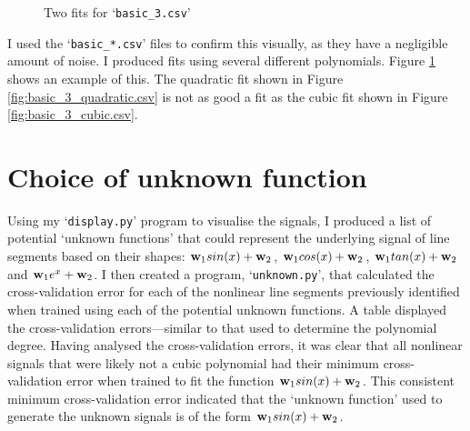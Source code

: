 \documentclass[onecolumn, 12pt, a4paper]{article}
\begin{document}
\begin{figure}[htbp]
    \centering
    \hfill
    \caption{Two fits for `\texttt{basic\_3.csv}'}
    \label{fig:basic_3.csv}
\end{figure}

I used the `\texttt{basic\_*.csv}' files to confirm this visually,
as they have a negligible amount of noise.
I produced fits using several different polynomials.
Figure \ref{fig:basic_3.csv} shows an example of this.
The quadratic fit shown in Figure \ref{fig:basic_3_quadratic.csv}
is not as good a fit as the cubic fit shown in Figure \ref{fig:basic_3_cubic.csv}.

\section{Choice of unknown function}

Using my `\texttt{display.py}' program to visualise the
signals, I produced a list of potential `unknown functions'
that could represent the underlying signal of line segments
based on their shapes:
$\vb{w}_{1}sin(x) + \vb{w}_{2}$,
$\vb{w}_{1}cos(x) + \vb{w}_{2}$,
$\vb{w}_{1}tan(x) + \vb{w}_{2}$ and
$\vb{w}_{1}e^{x} + \vb{w}_{2}$.
I then created a program, `\texttt{unknown.py}', that
calculated the cross-validation error for each of the
nonlinear line segments previously identified when
trained using each of the potential unknown functions.
A table displayed the cross-validation errors---similar 
to that used to determine the polynomial degree.
Having analysed the cross-validation errors, it was clear
that all nonlinear signals that were likely not
a cubic polynomial had their minimum cross-validation
error when trained to fit the function
$\vb{w}_{1}sin(x) + \vb{w}_{2}$.
This consistent minimum cross-validation error indicated
that the `unknown function' used to generate the unknown
signals is of the form $\vb{w}_{1}sin(x) + \vb{w}_{2}$.
\end{document}

